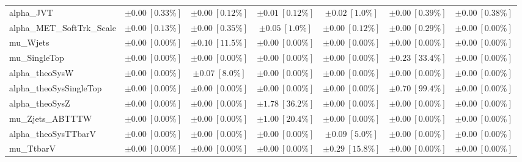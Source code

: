 \begin{sidewaystable}
\begin{center}
\begin{tabular*}{\textwidth}{@{\extracolsep{\fill}}lcccccc}
alpha\_JVT         & $\pm 0.00\ [0.33\%] $          & $\pm 0.00\ [0.12\%] $          & $\pm 0.01\ [0.12\%] $          & $\pm 0.02\ [1.0\%] $          & $\pm 0.00\ [0.39\%] $          & $\pm 0.00\ [0.38\%] $       \\
alpha\_MET\_SoftTrk\_Scale         & $\pm 0.00\ [0.13\%] $          & $\pm 0.00\ [0.35\%] $          & $\pm 0.05\ [1.0\%] $          & $\pm 0.00\ [0.12\%] $          & $\pm 0.00\ [0.29\%] $          & $\pm 0.00\ [0.00\%] $       \\
mu\_Wjets         & $\pm 0.00\ [0.00\%] $          & $\pm 0.10\ [11.5\%] $          & $\pm 0.00\ [0.00\%] $          & $\pm 0.00\ [0.00\%] $          & $\pm 0.00\ [0.00\%] $          & $\pm 0.00\ [0.00\%] $       \\
mu\_SingleTop         & $\pm 0.00\ [0.00\%] $          & $\pm 0.00\ [0.00\%] $          & $\pm 0.00\ [0.00\%] $          & $\pm 0.00\ [0.00\%] $          & $\pm 0.23\ [33.4\%] $          & $\pm 0.00\ [0.00\%] $       \\
alpha\_theoSysW         & $\pm 0.00\ [0.00\%] $          & $\pm 0.07\ [8.0\%] $          & $\pm 0.00\ [0.00\%] $          & $\pm 0.00\ [0.00\%] $          & $\pm 0.00\ [0.00\%] $          & $\pm 0.00\ [0.00\%] $       \\
alpha\_theoSysSingleTop         & $\pm 0.00\ [0.00\%] $          & $\pm 0.00\ [0.00\%] $          & $\pm 0.00\ [0.00\%] $          & $\pm 0.00\ [0.00\%] $          & $\pm 0.70\ [99.4\%] $          & $\pm 0.00\ [0.00\%] $       \\
alpha\_theoSysZ         & $\pm 0.00\ [0.00\%] $          & $\pm 0.00\ [0.00\%] $          & $\pm 1.78\ [36.2\%] $          & $\pm 0.00\ [0.00\%] $          & $\pm 0.00\ [0.00\%] $          & $\pm 0.00\ [0.00\%] $       \\
mu\_Zjets\_ABTTTW         & $\pm 0.00\ [0.00\%] $          & $\pm 0.00\ [0.00\%] $          & $\pm 1.00\ [20.4\%] $          & $\pm 0.00\ [0.00\%] $          & $\pm 0.00\ [0.00\%] $          & $\pm 0.00\ [0.00\%] $       \\
alpha\_theoSysTTbarV         & $\pm 0.00\ [0.00\%] $          & $\pm 0.00\ [0.00\%] $          & $\pm 0.00\ [0.00\%] $          & $\pm 0.09\ [5.0\%] $          & $\pm 0.00\ [0.00\%] $          & $\pm 0.00\ [0.00\%] $       \\
mu\_TtbarV         & $\pm 0.00\ [0.00\%] $          & $\pm 0.00\ [0.00\%] $          & $\pm 0.00\ [0.00\%] $          & $\pm 0.29\ [15.8\%] $          & $\pm 0.00\ [0.00\%] $          & $\pm 0.00\ [0.00\%] $       \\

\end{tabular*}
\end{center}
\end{sidewaystable}
